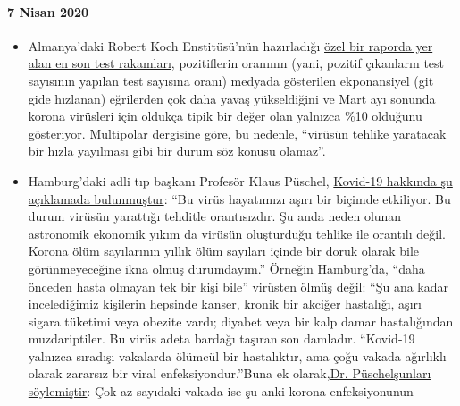 \hypertarget{7-nisan-2020}{%
\paragraph{7 Nisan 2020}\label{7-nisan-2020}}

\begin{itemize}
\tightlist
\item
  Almanya'daki Robert Koch Enstitüsü'nün hazırladığı
  \href{https://multipolar-magazin.de/artikel/coronavirus-regierung-ignoriert-daten}{özel
  bir raporda yer alan en son test rakamları}, pozitiflerin oranının
  (yani, pozitif çıkanların test sayısının yapılan test sayısına oranı)
  medyada gösterilen ekponansiyel (git gide hızlanan) eğrilerden çok
  daha yavaş yükseldiğini ve Mart ayı sonunda korona virüsleri için
  oldukça tipik bir değer olan yalnızca \%10 olduğunu gösteriyor.
  Multipolar dergisine göre, bu nedenle, ``virüsün tehlike yaratacak bir
  hızla yayılması gibi bir durum söz konusu olamaz''.
\item
  Hamburg'daki adli tıp başkanı Profesör Klaus Püschel,
  \href{https://www.pressreader.com/germany/hamburger-morgenpost/20200403/281487868456736}{Kovid-19
  hakkında şu açıklamada bulunmuştur}: ``Bu virüs hayatımızı aşırı bir
  biçimde etkiliyor. Bu durum virüsün yarattığı tehditle orantısızdır.
  Şu anda neden olunan astronomik ekonomik yıkım da virüsün oluşturduğu
  tehlike ile orantılı değil. Korona ölüm sayılarının yıllık ölüm
  sayıları içinde bir doruk olarak bile görünmeyeceğine ikna olmuş
  durumdayım.'' Örneğin Hamburg'da, ``daha önceden hasta olmayan tek bir
  kişi bile'' virüsten ölmüş değil: ``Şu ana kadar incelediğimiz
  kişilerin hepsinde kanser, kronik bir akciğer hastalığı, aşırı sigara
  tüketimi veya obezite vardı; diyabet veya bir kalp damar hastalığından
  muzdariptiler. Bu virüs adeta bardağı taşıran son damladır. ``Kovid-19
  yalnızca sıradışı vakalarda ölümcül bir hastalıktır, ama çoğu vakada
  ağırlıklı olarak zararsız bir viral enfeksiyondur.''Buna ek
  olarak,\href{https://www.abendblatt.de/hamburg/article228828787/rechtsmedizin-pueschel-hamburg-corona-virus-infektion-covid-19-coronavirus-krise-patienten-krankenhaeuser-kliniken-infektionsrate-krankheit-pandemie-test-lungenkrankheit-sars-cov-epidemie-sars-cov-2.html}{Dr.
  Püschel}\href{https://www.abendblatt.de/hamburg/article228828787/rechtsmedizin-pueschel-hamburg-corona-virus-infektion-covid-19-coronavirus-krise-patienten-krankenhaeuser-kliniken-infektionsrate-krankheit-pandemie-test-lungenkrankheit-sars-cov-epidemie-sars-cov-2.html}{şunları
  söylemiştir}: Çok az sayıdaki vakada ise şu anki korona enfeksiyonunun

\end{itemize}

